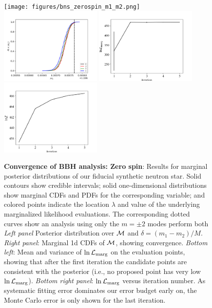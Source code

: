 \documentclass[twocolumn,prd,nofootinbib]{revtex4}
\newcommand\editremark[1]{{\color{red} #1}}
\newcommand{\mc}{{\cal M}}
\begin{document}
\begin{figure}
\texttt{[image: figures/bns\_zerospin\_m1\_m2.png]}
\includegraphics[width=0.45\textwidth]{figures/bns_zerospin_mc_cum.png}
\includegraphics[width=0.45\textwidth]{figures/bns_zerospin_lnL_meanVar.png}
\includegraphics[width=0.45\textwidth]{figures/bns_zerospin_lnL_converge.png}
\caption{\label{fig:BBH:MultiIterate}\textbf{Convergence of BBH analysis: Zero spin}: Results for marginal posterior distributions
  of our fiducial synthetic neutron star.  Solid contours show credible intervals; solid one-dimensional distributions
  show marginal CDFs and PDFs for the corresponding variable; and colored points indicate the location $\lambda$ and
  value of the underlying marginalized likelihood evaluations.   The corresponding dotted curves show an analysis using
  only the $m=\pm 2$ modes \editremark{perform both} \emph{Left panel } Posterior distribution
  over  $\mc$ and
  $\delta=(m_1-m_2)/M$.    \emph{Right panel}: Marginal 1d CDFs of $\mc$, showing convergence.
\emph{Bottom left}: Mean and variance of  $\ln{\cal L}_{\rm marg}$ on the evaluation points,  showing that after the
first iteration the
candidate points are consistent with the posterior (i.e., no proposed point has very low $\ln {\cal L}_{\rm marg}$).
\emph{Bottom right panel}: $\ln {\cal L}_{\rm marg}$ versus iteration number.  As systematic fitting error dominates our
error budget early on, the Monte Carlo error is only shown for the last iteration.
}
\end{figure}
\end{document}

